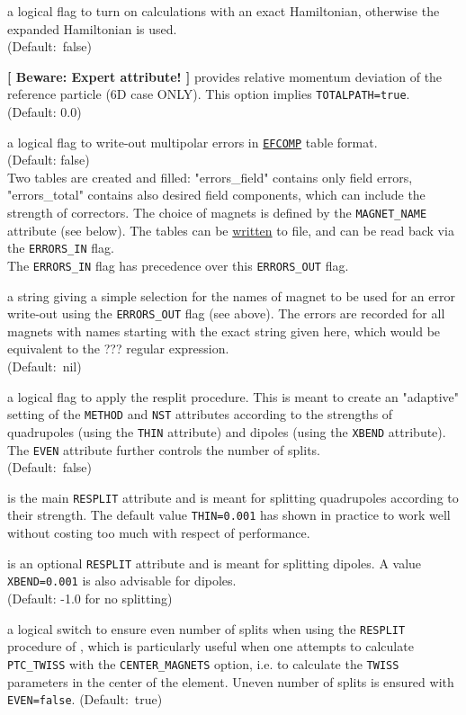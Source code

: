 \begin{madlist}
   a logical flag to turn on calculations with an exact
  Hamiltonian, otherwise the expanded Hamiltonian is used. \\
  (Default:~false)

   \textbf{[ Beware: Expert attribute! ]}
  provides relative momentum deviation of the reference particle (6D case
  ONLY). This option implies \texttt{TOTALPATH=true}. \\
  (Default: 0.0)

   a logical flag to write-out multipolar errors
  in \hyperref[sec:efcomp]{\texttt{EFCOMP}} table format. 
  \\ (Default: false) \\
  Two tables are created and filled: "errors\_field" contains only
  field errors, "errors\_total" contains also desired field
  components, which can include the strength of correctors.  
  The choice of magnets is defined by the \texttt{MAGNET\_NAME}
  attribute (see below). 
  The tables can be \hyperref[sec:write]{written} to file, and can be
  read back via the \texttt{ERRORS\_IN} flag.\\ 
  The \texttt{ERRORS\_IN} flag has precedence over this \texttt{ERRORS\_OUT} flag.

   a string giving a simple selection for the
  names of magnet to be used for an error write-out using the
  \texttt{ERRORS\_OUT} flag (see above). The errors are recorded for all 
  magnets with names starting with the exact string given here, which
  would be equivalent to the ??? regular expression.\\
  (Default:~nil)

   a logical flag to apply the \ptc resplit
  procedure. This is meant to create an "adaptive" setting of the
  \texttt{METHOD} and \texttt{NST} attributes according to the strengths
  of quadrupoles (using the \texttt{THIN}  attribute) and dipoles (using
  the \texttt{XBEND} attribute). The \texttt{EVEN} attribute further
  controls the number of splits.  \\
  (Default:~false)

   is the main \texttt{RESPLIT} attribute and is meant for
  splitting quadrupoles according to their strength. The default value
  \texttt{THIN=0.001} has shown in practice to work well without costing
  too much with respect of performance.
  
   is an optional \texttt{RESPLIT} attribute and is meant for
  splitting dipoles. A value \texttt{XBEND=0.001} is also advisable for
  dipoles. \\
  (Default: -1.0 for no splitting)

   a logical switch to ensure even number of splits when
  using the \texttt{RESPLIT}  procedure of \ptc, which is particularly
  useful when one attempts to calculate \texttt{PTC\_TWISS} with the
  \texttt{CENTER\_MAGNETS} option, i.e. to calculate the \texttt{TWISS} 
  parameters in the center of the element. 
  Uneven number of splits is ensured with \texttt{EVEN=false}.
  (Default:~true)
\end{madlist}

